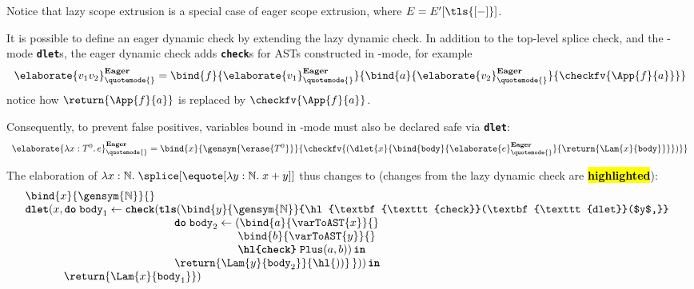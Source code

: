 Notice that lazy scope extrusion is a special case of eager scope extrusion, where $E = E'[\tls{[-]}]$. 

It is possible to define an eager dynamic check by extending the lazy dynamic check. In addition to the top-level splice check, and the \compilemode{}-mode \textbf{\texttt{dlet}}s, the eager dynamic check adds \textbf{\texttt{check}}s for ASTs constructed in \quotemode{}-mode, for example 
\[\elaborate{v_1 v_2}_{\quotemode{}}^{\textbf{Eager}} = \bind{f}{\elaborate{v_1}_{\quotemode{}}^{\textbf{Eager}}}{\bind{a}{\elaborate{v_2}_{\quotemode{}}^{\textbf{Eager}}}{\checkfv{\App{f}{a}}}}\]
notice how $\return{\App{f}{a}}$ is replaced by $\checkfv{\App{f}{a}}$. 

Consequently, to prevent false positives, variables bound in \quotemode{}-mode must also be declared safe via \textbf{\texttt{dlet}}:
{
  \footnotesize
\[
\begin{array}{rcl}
\elaborate{\lambda x: T^0. \, e}_{\quotemode{}}^{\textbf{Eager}} = \bind{x}{\gensym{\erase{T^0}}}{\checkfv{(\dlet{x}{\bind{\texttt{body}}{\elaborate{e}_{\quotemode{}}^\textbf{Eager}}{\return{\Lam{x}{\texttt{body}}}}})}}
\end{array}\]
}

The elaboration of $\lambda x:\mathbb{N}. \; \splice[{\equote[\lambda{y}: \mathbb{N}. \; x+y]}]$ thus changes to (changes from the lazy dynamic check are \textbf{\hl{highlighted}}):
{
\[\begin{array}{@{}l}
  \bind{x}{\gensym{\mathbb{N}}}{} \\
  {\textbf{\texttt{dlet}}(}{x}, \textbf{\texttt{do}} \; {\texttt{body}_1} \leftarrow {\textbf{\texttt{check}}(}\textbf{\texttt{tls}}({\bind{y}{\gensym{\mathbb{N}}}{\hl{\textbf{\texttt{check}}(\textbf{\texttt{dlet}}($y$,}}} \\
    \quad\quad\quad\quad\quad\quad\quad
    \quad\quad\quad\quad\quad\quad\,\,
    \textbf{\texttt{do}}\;{\texttt{body}_2} \leftarrow {(\bind{a}{\varToAST{x}}{}}\\
    \quad\quad\quad\quad\quad\quad\quad\quad
    \quad\quad\quad\quad\quad\quad\quad\quad
    \quad\quad\quad
    \bind{b}{\varToAST{y}}{}\\
    \quad\quad\quad\quad\quad\quad\quad\quad
    \quad\quad\quad\quad\quad\quad\quad\quad
    \quad\quad\quad
    \textbf{\texttt{\hl{check}}}\;{\texttt{Plus}(a, b)}) \, \textbf{\texttt{in}}\\
    \quad\quad\quad\quad\quad\quad\quad
    \quad\quad\quad\quad\quad\quad\,\,
    \return{\Lam{y}{\texttt{body}_2}}{\hl{))}\,})) \, \textbf{\texttt{in}}\\
  \quad\quad\quad\;\, {\return{\Lam{x}{\texttt{body}_1}}})
\end{array}\]
}

